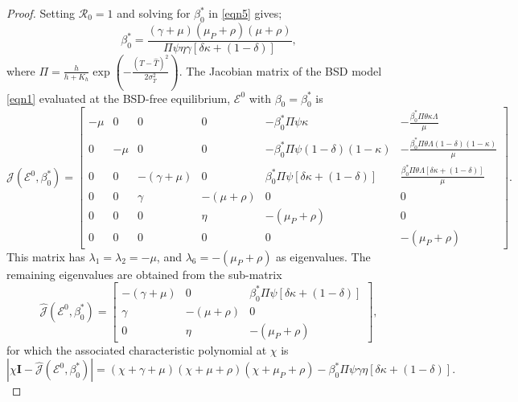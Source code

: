 \documentclass[11pt]{article}
\newcommand\bfI{\mathbf{I}}
\numberwithin{equation}{section}
\begin{document}
\begin{proof}
    Setting $\mathcal{R}_0=1$ and solving for $\beta_0^*$ in \eqref{eqn5} gives;
    \begin{equation}\label{eqn7}
        \beta_0^*=\frac{(\gamma+\mu)(\mu_P+\rho)(\mu+\rho)}{\Pi\psi\eta\gamma[\delta\kappa+(1-\delta)]},
    \end{equation}
    where $\Pi=\frac{h}{h+K_h}\exp{\left(-\frac{(T-\hat{T})^2}{2\sigma_T^2}\right)}$. The Jacobian matrix of the BSD model \eqref{eqn1} evaluated at the BSD-free equilibrium, $\mathcal{E}^0$ with $\beta_0=\beta_0^*$ is
    \begin{equation}\label{eqn8}
        \mathcal{J}(\mathcal{E}^0,\beta_0^*)=
        \begin{bmatrix}
            -\mu&0&0&0&-\beta_0^*\Pi\psi\kappa&-\frac{\beta_0^*\Pi\theta\kappa\Lambda}{\mu}\\
            0&-\mu&0&0&-\beta_0^*\Pi\psi(1-\delta)(1-\kappa)&-\frac{\beta_0^*\Pi\theta\Lambda(1-\delta)(1-\kappa)}{\mu}\\
            0&0&-(\gamma+\mu)&0&\beta_0^*\Pi\psi[\delta\kappa+(1-\delta)]&\frac{\beta_0^*\Pi\theta\Lambda[\delta\kappa+(1-\delta)]}{\mu}\\
            0&0&\gamma&-(\mu+\rho)&0&0\\
            0&0&0&\eta&-(\mu_P+\rho)&0\\
            0&0&0&0&0&-(\mu_P+\rho)
        \end{bmatrix}.
    \end{equation}
    This matrix has $\lambda_1=\lambda_2=-\mu$, and $\lambda_6=-(\mu_P+\rho)$ as eigenvalues. The remaining eigenvalues are obtained from the sub-matrix
    \begin{equation}\label{eqn9}
        \hat{\mathcal{J}}(\mathcal{E}^0,\beta_0^*)=
        \begin{bmatrix}
            -(\gamma+\mu)&0&\beta_0^*\Pi\psi[\delta\kappa+(1-\delta)]\\
            \gamma&-(\mu+\rho)&0\\
            0&\eta&-(\mu_P+\rho)
        \end{bmatrix},
    \end{equation}
    for which the associated characteristic polynomial at $\chi$ is
    \begin{equation}
        |\chi\bfI-\hat{\mathcal{J}}(\mathcal{E}^0,\beta_0^*)|=(\chi+\gamma+\mu)(\chi+\mu+\rho)(\chi+\mu_P+\rho)-\beta_0^*\Pi\psi\gamma\eta[\delta\kappa+(1-\delta)].
    \end{equation}

\end{proof}
\end{document}
